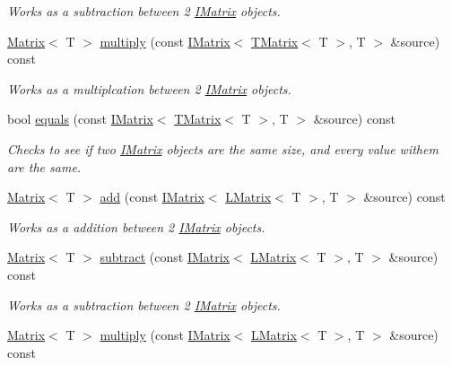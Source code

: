 \begin{DoxyCompactItemize}
\begin{DoxyCompactList}\small\item\em Works as a subtraction between 2 \mbox{\hyperlink{class_i_matrix}{I\+Matrix}} objects. \end{DoxyCompactList}\item 
\mbox{\hyperlink{class_matrix}{Matrix}}$<$ T $>$ \mbox{\hyperlink{class_d_matrix_a0c935ff687d7a824da067a1f7f152dd6}{multiply}} (const \mbox{\hyperlink{class_i_matrix}{I\+Matrix}}$<$ \mbox{\hyperlink{class_t_matrix}{T\+Matrix}}$<$ T $>$, T $>$ \&source) const
\begin{DoxyCompactList}\small\item\em Works as a multiplcation between 2 \mbox{\hyperlink{class_i_matrix}{I\+Matrix}} objects. \end{DoxyCompactList}\item 
bool \mbox{\hyperlink{class_d_matrix_a51e08cb9c9b3529b0575ea9668d70af1}{equals}} (const \mbox{\hyperlink{class_i_matrix}{I\+Matrix}}$<$ \mbox{\hyperlink{class_t_matrix}{T\+Matrix}}$<$ T $>$, T $>$ \&source) const
\begin{DoxyCompactList}\small\item\em Checks to see if two \mbox{\hyperlink{class_i_matrix}{I\+Matrix}} objects are the same size, and every value withem are the same. \end{DoxyCompactList}\item 
\mbox{\hyperlink{class_matrix}{Matrix}}$<$ T $>$ \mbox{\hyperlink{class_d_matrix_a77e3677fb5a94dd3b7012b7e7190d0ae}{add}} (const \mbox{\hyperlink{class_i_matrix}{I\+Matrix}}$<$ \mbox{\hyperlink{class_l_matrix}{L\+Matrix}}$<$ T $>$, T $>$ \&source) const
\begin{DoxyCompactList}\small\item\em Works as a addition between 2 \mbox{\hyperlink{class_i_matrix}{I\+Matrix}} objects. \end{DoxyCompactList}\item 
\mbox{\hyperlink{class_matrix}{Matrix}}$<$ T $>$ \mbox{\hyperlink{class_d_matrix_a8226018d72004cdbf1c575302b2ddd79}{subtract}} (const \mbox{\hyperlink{class_i_matrix}{I\+Matrix}}$<$ \mbox{\hyperlink{class_l_matrix}{L\+Matrix}}$<$ T $>$, T $>$ \&source) const
\begin{DoxyCompactList}\small\item\em Works as a subtraction between 2 \mbox{\hyperlink{class_i_matrix}{I\+Matrix}} objects. \end{DoxyCompactList}\item 
\mbox{\hyperlink{class_matrix}{Matrix}}$<$ T $>$ \mbox{\hyperlink{class_d_matrix_ab2d385b9272369aa3e52aa6a9c55d9da}{multiply}} (const \mbox{\hyperlink{class_i_matrix}{I\+Matrix}}$<$ \mbox{\hyperlink{class_l_matrix}{L\+Matrix}}$<$ T $>$, T $>$ \&source) const

\end{DoxyCompactItemize}

